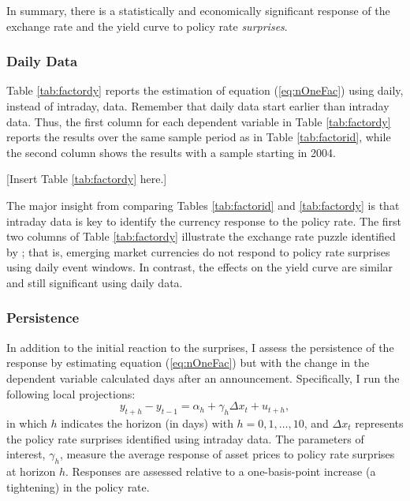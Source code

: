 \documentclass[a4paper,12pt]{article} 		%
\newcommand{\sectitlespace}{\vspace{0.1in}}
\providecommand{\idxt}{t}
\providecommand{\idxh}{h}
\providecommand{\idxsfwd}{\idxt+\idxh}
\providecommand{\idxslag}{\idxt-1}
\providecommand{\yld}{y}
\providecommand{\mps}{\Delta x_{\idxt}}
\newcommand{\eqLP}{\yld_{\idxsfwd} - \yld_{\idxslag} = \alpha_{\idxh} + \gamma_{\idxh} \mps + u_{\idxsfwd}}
\begin{document}
In summary, there is a statistically and economically significant response of the exchange rate and the yield curve to policy rate \textit{surprises}. 

\sectitlespace
\subsubsection{Daily Data}
\sectitlespace
Table \ref{tab:factordy} reports the estimation of equation (\ref{eq:nOneFac}) using daily, instead of intraday, data. Remember that daily data start earlier than intraday data. Thus, the first column for each dependent variable in Table \ref{tab:factordy} reports the results over the same sample period as in Table \ref{tab:factorid}, while the second column shows the results with a sample starting in 2004.

\begin{center}
	[Insert Table \ref{tab:factordy} here.]
\end{center}

The major insight from comparing Tables \ref{tab:factorid} and \ref{tab:factordy} is that intraday data is key to identify the currency response to the policy rate. The first two columns of Table \ref{tab:factordy} illustrate the exchange rate puzzle identified by \textcite{Kohlscheen:2014}; that is, emerging market currencies do not respond to policy rate surprises using daily event windows. In contrast, the effects on the yield curve are similar and still significant using daily data. 

\sectitlespace
\subsubsection{Persistence}
\sectitlespace
In addition to the initial reaction to the surprises, I assess the persistence of the response by estimating equation (\ref{eq:nOneFac}) but with the change in the dependent variable calculated days after an announcement. Specifically, I run the following local projections:
\begin{equation} \label{eq:nLP}
	\eqLP,
\end{equation}
\noindent in which \(\idxh\) indicates the horizon (in days) with \(\idxh = 0, 1, \ldots, 10\), and \(\mps\) represents the policy rate surprises identified using intraday data. The parameters of interest, \(\gamma_{\idxh}\), measure the average response of asset prices to policy rate surprises at horizon \(\idxh\). Responses are assessed relative to a one-basis-point increase (a tightening) in the policy rate. 
\end{document}
